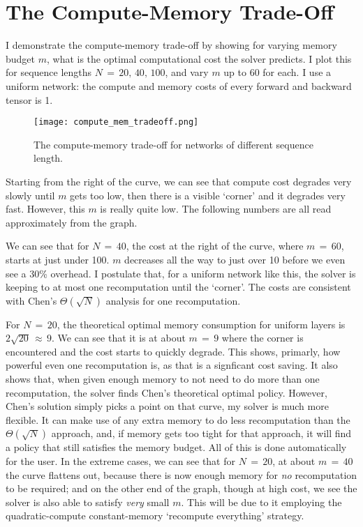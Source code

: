 \section{The Compute-Memory Trade-Off}
I demonstrate the compute-memory trade-off by showing for varying memory budget \(m\), what is the optimal computational cost the solver predicts.
I plot this for sequence lengths \(N\,=\, 20,\,40,\,100\), and vary \(m\) up to \(60\) for each.
I use a uniform network: the compute and memory costs of every forward and backward tensor is 1.

\begin{figure}[h]
    \centering
    \texttt{[image: compute\_mem\_tradeoff.png]}
    \caption{The compute-memory trade-off for networks of different sequence length.}
    \label{fig:4-cm-tradeoff}
\end{figure}

Starting from the right of the curve, we can see that compute cost degrades very slowly until \(m\) gets too low, then there is a visible `corner' and it degrades very fast.
However, this \(m\) is really quite low.
The following numbers are all read approximately from the graph.

We can see that for \(N\,=\,40\), the cost at the right of the curve, where \(m\,=\,60\), starts at just under 100.
\(m\) decreases all the way to just over 10 before we even see a 30\% overhead.
I postulate that, for a uniform network like this, the solver is keeping to at most one recomputation until the `corner'.
The costs are consistent with Chen's \(\Theta(\sqrt{N})\) analysis for one recomputation.

For \(N\,=\,20\), the theoretical optimal memory consumption for uniform layers is \(2\sqrt{20}\,\approx\,9\).
We can see that it is at about \(m\,=\,9\) where the corner is encountered and the cost starts to quickly degrade.
This shows, primarly, how powerful even one recomputation is, as that is a signficant cost saving.
It also shows that, when given enough memory to not need to do more than one recomputation, the solver finds Chen's theoretical optimal policy.
However, Chen's solution simply picks a point on that curve, my solver is much more flexible.
It can make use of any extra memory to do less recomputation than the \(\Theta(\sqrt{N})\) approach, and, if memory gets too tight for that approach, it will find a policy that still satisfies the memory budget.
All of this is done automatically for the user.
In the extreme cases, we can see that for \(N\,=\,20\), at about \(m\,=\,40\) the curve flattens out, because there is now enough memory for \textit{no} recomputation to be required;
and on the other end of the graph, though at high cost, we see the solver is also able to satisfy \textit{very} small \(m\).
This will be due to it employing the quadratic-compute constant-memory `recompute everything' strategy.

